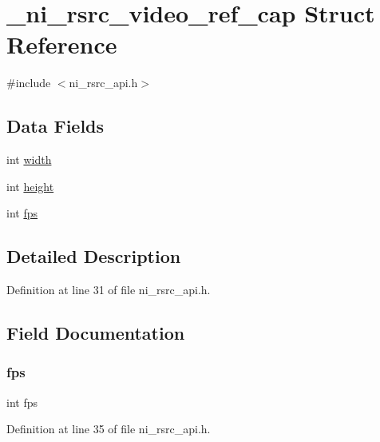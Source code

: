 \hypertarget{struct__ni__rsrc__video__ref__cap}{}\section{\+\_\+ni\+\_\+rsrc\+\_\+video\+\_\+ref\+\_\+cap Struct Reference}
\label{struct__ni__rsrc__video__ref__cap}


{\ttfamily \#include $<$ni\+\_\+rsrc\+\_\+api.\+h$>$}

\subsection*{Data Fields}
\begin{DoxyCompactItemize}
\item 
int \mbox{\hyperlink{struct__ni__rsrc__video__ref__cap_a2474a5474cbff19523a51eb1de01cda4}{width}}
\item 
int \mbox{\hyperlink{struct__ni__rsrc__video__ref__cap_ad12fc34ce789bce6c8a05d8a17138534}{height}}
\item 
int \mbox{\hyperlink{struct__ni__rsrc__video__ref__cap_a45b67662d620a977a2cfe519f7ab6273}{fps}}
\end{DoxyCompactItemize}


\subsection{Detailed Description}


Definition at line 31 of file ni\+\_\+rsrc\+\_\+api.\+h.



\subsection{Field Documentation}
\mbox{\label{struct__ni__rsrc__video__ref__cap_a45b67662d620a977a2cfe519f7ab6273}} 
\subsubsection{\texorpdfstring{fps}{fps}}
{\footnotesize\ttfamily int fps}



Definition at line 35 of file ni\+\_\+rsrc\+\_\+api.\+h.

